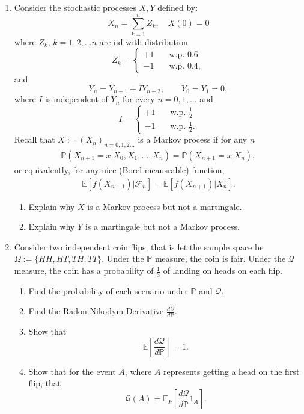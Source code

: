 \documentclass[11pt]{article}
\newcommand{\E}{\mathbb{E}}
\newcommand{\PR}{\mathbb{P}}
\renewcommand{\Pr}{\mathbb{P}}
\newcommand{\Q}{\mathcal{Q}}
\begin{document}
\begin{enumerate}
		\item Consider the stochastic processes \( X, Y \) defined by:
		\[	X_n = \sum_{k=1}^{n}Z_{k},\quad X(0) = 0
		\]
		where $Z_{k}$, $k=1,2,...n$ are iid with distribution 
		\[	Z_{k} = \begin{cases}
			+1 &  \quad \text{w.p. } 0.6 \\
			-1 & \quad \text{w.p. } 0.4,
		\end{cases}
		\]
		and 
		\[
		Y_n = Y_{n-1} + IY_{n-2},\qquad Y_0 = Y_1 = 0,
		\]
		where \( I \) is independent of \( Y_n \) for every \( n=0,1,\ldots \) and 
		\[
		I = \begin{cases}
			+1 &  \quad \text{w.p. } \frac{1}{2} \\
			-1 & \quad \text{w.p. } \frac{1}{2}.
		\end{cases}
		\]
		Recall that \( X:=(X_n)_{n=0,1,2\ldots} \) is a Markov process if for any \( n \)
		\begin{align*}
			\Pr(X_{n+1} = x| X_0, X_1, \ldots, X_n) = \Pr(X_{n+1} = x | X_n),
		\end{align*}
		or equivalently, for any nice (Borel-meausrable) function,
		\begin{align*}
			\E[f(X_{n+1})|\mathcal{F}_n] = \E[f(X_{n+1}) | X_n].
		\end{align*}
		\begin{enumerate}
			\item Explain why \( X \) is a Markov process but not a martingale.
			\item Explain why \( Y \) is a martingale but not a Markov process.
		\end{enumerate}
		\item Consider two independent coin flips; that is let the sample space be $\Omega:=\{HH, HT, TH, TT\}$. Under the $\PR$ measure, the coin is fair. Under the $\Q$ measure, the coin has a probability of $\frac{1}{3}$ of landing on heads on each flip. 
		\begin{enumerate}
			\item Find the probability of each scenario under $\PR$ and $\Q$.
			\item Find the Radon-Nikodym Derivative $\frac{d\Q}{d\PR}$.
			\item Show that 
				\[
					\E\left[\frac{d\Q}{d\PR}\right] = 1.
					\]
			\item Show that for the event $A$, where $A$ represents getting a head on the first flip, that
			\[	\Q(A) = \E_{P}\left[\frac{d\Q}{d\PR}1_{A}\right].
			\]
		\end{enumerate}

\end{enumerate}
\end{document}
